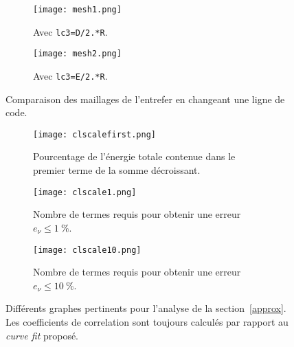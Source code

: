 \documentclass[11pt]{article}
\begin{document}
\begin{figure}[H]
	\centering
	\begin{subfigure}{0.194\textwidth}
		\centering
		\texttt{[image: mesh1.png]}
		\caption{Avec \texttt{lc3=D/2.*R}.}
		\label{fig:mesh1}
	\end{subfigure}\hspace{3cm}
	\begin{subfigure}{0.24\textwidth}
		\centering
		\texttt{[image: mesh2.png]}
		\caption{Avec \texttt{lc3=E/2.*R}.}
		\label{fig:mesh2}
	\end{subfigure}
	\caption{Comparaison des maillages de l'entrefer en changeant une ligne de code.}
	\label{fig:mesh}
\end{figure}

\begin{figure}[H]
	\centering
	\begin{subfigure}[t]{0.32\textwidth}
		\centering
		\texttt{[image: clscalefirst.png]}
		\caption{Pourcentage de l'énergie totale contenue dans le premier terme de la somme décroissant.}
		\label{fig:clscalefirst}
	\end{subfigure}\hfill
	\begin{subfigure}[t]{0.32\textwidth}
		\centering
		\texttt{[image: clscale1.png]}
		\caption{Nombre de termes requis pour obtenir une erreur $e_{\nu} \le \SI{1}{\percent}$.}
		\label{fig:clscale1}
	\end{subfigure}\hfill
	\begin{subfigure}[t]{0.32\textwidth}
		\centering
		\texttt{[image: clscale10.png]}
		\caption{Nombre de termes requis pour obtenir une erreur $e_{\nu} \le \SI{10}{\percent}$.}
		\label{fig:clscale10}
	\end{subfigure}
	\caption{Différents graphes pertinents pour l'analyse de la section~\ref{approx}.
	Les coefficients de correlation sont toujours calculés par rapport au \emph{curve fit} proposé.}
	\label{fig:figsec2}
\end{figure}
\end{document}
